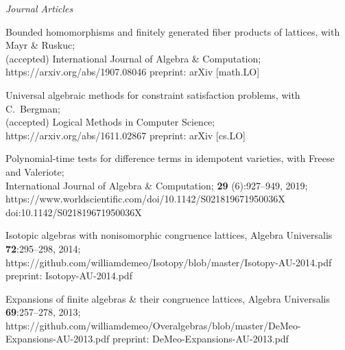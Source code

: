     {\it Journal Articles}\\[-6pt]
    \begin{enumerate}
      \pub
      {Bounded homomorphisms and finitely generated fiber products of lattices,}
      {with Mayr \& Ruskuc;\\ (accepted)}
      {International Journal of Algebra \& Computation;}
      {}
      {https://arxiv.org/abs/1907.08046}
      {preprint: arXiv [math.LO]}

      \vskip2mm

      \pub
      {Universal algebraic methods for constraint satisfaction problems,}
      {with C.~Bergman; \\(accepted)}
      {Logical Methods in Computer Science;}
      {}
      {https://arxiv.org/abs/1611.02867}
      {preprint: arXiv [cs.LO]}
        
      \vskip2mm

      \pub
      {Polynomial-time tests for difference terms in idempotent varieties,}
      {with Freese and Valeriote;\\}
      {International Journal of Algebra \& Computation;}
      {\textbf{29} (6):927--949, 2019;\\}
      {https://www.worldscientific.com/doi/10.1142/S021819671950036X}
      {{\small doi:10.1142/S021819671950036X}}
      
      \vskip2mm

      \pub
      {Isotopic algebras with nonisomorphic congruence lattices,}
      {\hskip-1mm}  %
      {Algebra Universalis}
      {\textbf{72}:295--298, 2014;} 
      {https://github.com/williamdemeo/Isotopy/blob/master/Isotopy-AU-2014.pdf}
      {preprint: Isotopy-AU-2014.pdf}
      
      \vskip2mm

      \pub
      {Expansions of finite algebras \& their congruence lattices,}
      {\hskip-1mm}
      {Algebra Universalis}
      {\textbf{69}:257--278, 2013;}
      {https://github.com/williamdemeo/Overalgebras/blob/master/DeMeo-Expansions-AU-2013.pdf}
      {preprint: DeMeo-Expansions-AU-2013.pdf}

    \end{enumerate}

